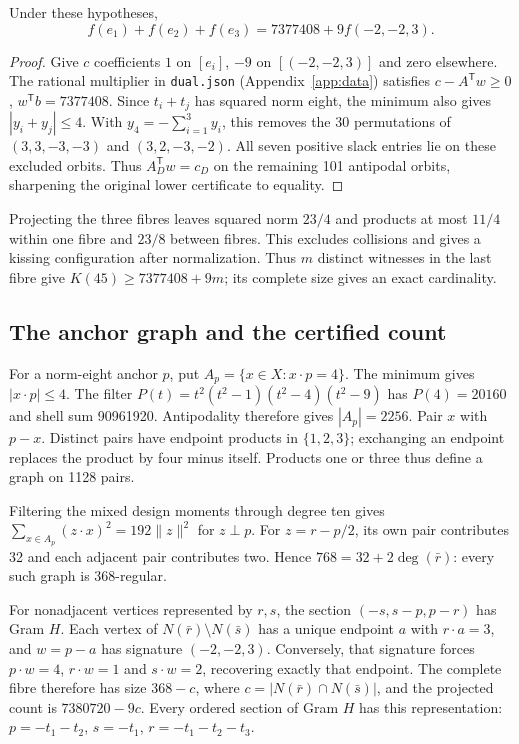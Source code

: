 \begin{proposition}\label{prop:moment45}
Under these hypotheses,
\[
f(e_1)+f(e_2)+f(e_3)=7377408+9f(-2,-2,3).
\]
\end{proposition}
\begin{proof}
Give $c$ coefficients $1$ on $[e_i]$, $-9$ on $[(-2,-2,3)]$ and
zero elsewhere. The rational multiplier in \texttt{dual.json}
(Appendix~\ref{app:data}) satisfies
$c-A^{\mathsf T}w\ge0$, $w^{\mathsf T}b=7377408$.
Since $t_i+t_j$ has squared norm eight, the minimum also gives
$|y_i+y_j|\le4$. With $y_4=-\sum_{i=1}^3y_i$, this removes the 30
permutations of $(3,3,-3,-3)$ and $(3,2,-3,-2)$.
All seven positive slack entries lie on these excluded orbits.
Thus $A_D^{\mathsf T}w=c_D$ on the remaining 101 antipodal orbits,
sharpening the original lower certificate to equality.
\end{proof}

Projecting the three fibres leaves squared norm $23/4$ and products
at most $11/4$ within one fibre and $23/8$ between fibres. This
excludes collisions and gives a kissing configuration after
normalization. Thus $m$ distinct witnesses in the last fibre give
$K(45)\ge7377408+9m$; its complete size gives an exact cardinality.

\subsection{The anchor graph and the certified count}
For a norm-eight anchor $p$, put $A_p=\{x\in X:x\cdot p=4\}$.
The minimum gives $|x\cdot p|\le4$. The filter
$P(t)=t^2(t^2-1)(t^2-4)(t^2-9)$ has $P(4)=20160$ and shell sum
90961920. Antipodality therefore gives $|A_p|=2256$.
Pair $x$ with $p-x$. Distinct pairs have endpoint products in
$\{1,2,3\}$; exchanging an endpoint replaces the product by four
minus itself. Products one or three thus define a graph on 1128 pairs.

Filtering the mixed design moments through degree ten gives
$\sum_{x\in A_p}(z\cdot x)^2=192\|z\|^2$ for $z\perp p$.
For $z=r-p/2$, its own pair contributes 32 and each adjacent pair
contributes two. Hence $768=32+2\deg(\bar r)$: every such graph is
368-regular.

For nonadjacent vertices represented by $r,s$, the section
$(-s,s-p,p-r)$ has Gram $H$. Each vertex of
$N(\bar r)\setminus N(\bar s)$ has a unique endpoint $a$ with
$r\cdot a=3$, and $w=p-a$ has signature $(-2,-2,3)$.
Conversely, that signature forces $p\cdot w=4$, $r\cdot w=1$ and
$s\cdot w=2$, recovering exactly that endpoint. The complete fibre
therefore has size $368-c$, where $c=|N(\bar r)\cap N(\bar s)|$,
and the projected count is $7380720-9c$.
Every ordered section of Gram $H$ has this representation:
$p=-t_1-t_2$, $s=-t_1$, $r=-t_1-t_2-t_3$.

